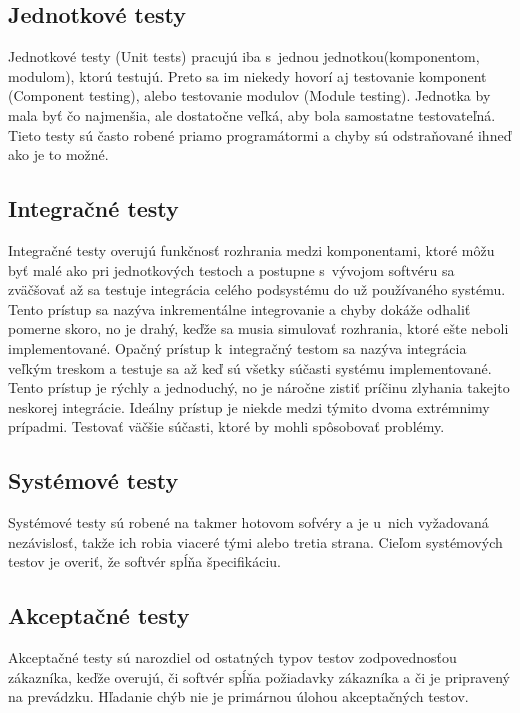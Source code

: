 \subsection*{Jednotkové testy}
\label{unit_tests}
Jednotkové testy (Unit tests) pracujú iba s~jednou jednotkou(komponentom, modulom), ktorú testujú.
Preto sa im niekedy hovorí aj testovanie komponent (Component testing), alebo testovanie modulov (Module testing).
Jednotka by mala byť čo najmenšia, ale dostatočne veľká, aby bola samostatne testovateľná.
Tieto testy sú často robené priamo programátormi a chyby sú odstraňované ihneď ako je to možné.

\subsection*{Integračné testy}
\label{integration_tests}
Integračné testy overujú funkčnosť rozhrania medzi komponentami, ktoré môžu byť malé ako pri jednotkových testoch a postupne s~vývojom softvéru sa zväčšovať až sa testuje integrácia celého podsystému do už používaného systému.
Tento prístup sa nazýva inkrementálne integrovanie a chyby dokáže odhaliť pomerne skoro, no je drahý, keďže sa musia simulovať rozhrania, ktoré ešte neboli implementované.
Opačný prístup k~integračný testom sa nazýva integrácia veľkým treskom a testuje sa až keď sú všetky súčasti systému implementované.
Tento prístup je rýchly a jednoduchý, no je náročne zistiť príčinu zlyhania takejto neskorej integrácie.
Ideálny prístup je niekde medzi týmito dvoma extrémnimy prípadmi.
Testovať väčšie súčasti, ktoré by mohli spôsobovať problémy.

\subsection*{Systémové testy}
\label{system_tests}
Systémové testy sú robené na takmer hotovom sofvéry a je u~nich vyžadovaná nezávislosť, takže ich robia viaceré tými alebo tretia strana.
Cieľom systémových testov je overiť, že softvér spĺňa špecifikáciu.

\subsection*{Akceptačné testy}
\label{acceptance_tests}
Akceptačné testy sú narozdiel od ostatných typov testov zodpovednosťou zákazníka, keďže overujú, či softvér spĺňa požiadavky zákazníka a či je pripravený na prevádzku.
Hľadanie chýb nie je primárnou úlohou akceptačných testov.

